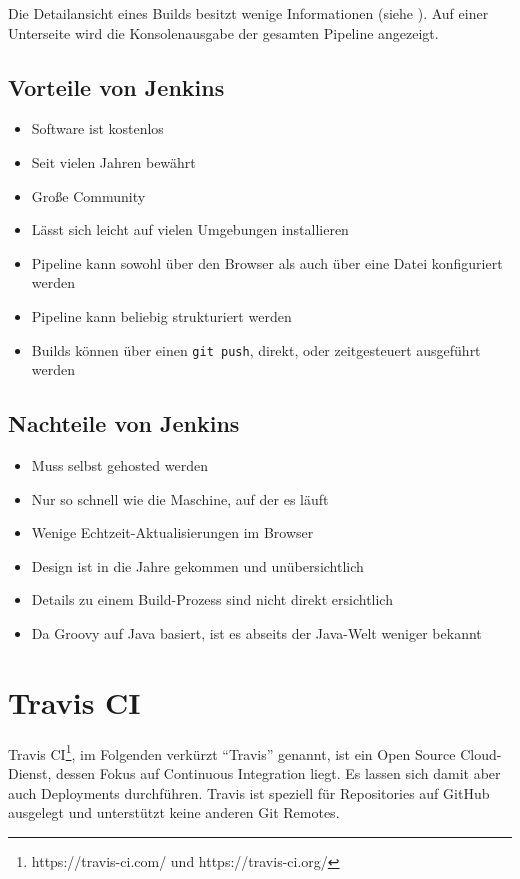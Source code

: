 Die Detailansicht eines Builds besitzt wenige Informationen (siehe ). Auf einer Unterseite wird die Konsolenausgabe der gesamten Pipeline angezeigt.

\subsection*{Vorteile von Jenkins}

\begin{itemize}
  \item Software ist kostenlos
  \item Seit vielen Jahren bewährt
  \item Große Community
  \item Lässt sich leicht auf vielen Umgebungen installieren
  \item Pipeline kann sowohl über den Browser als auch über eine Datei konfiguriert werden
  \item Pipeline kann beliebig strukturiert werden
  \item Builds können über einen \texttt{git push}, direkt, oder zeitgesteuert ausgeführt werden
\end{itemize}

\subsection*{Nachteile von Jenkins}

\begin{itemize}
  \item Muss selbst gehosted werden
  \item Nur so schnell wie die Maschine, auf der es läuft
  \item Wenige Echtzeit-Aktualisierungen im Browser
  \item Design ist in die Jahre gekommen und unübersichtlich
  \item Details zu einem Build-Prozess sind nicht direkt ersichtlich
  \item Da Groovy auf Java basiert, ist es abseits der Java-Welt weniger bekannt
\end{itemize}

\section{Travis CI}
\label{sec:analyse-travis}

Travis CI\footnote{https://travis-ci.com/ und https://travis-ci.org/}, im Folgenden verkürzt ``Travis'' genannt, ist ein Open Source Cloud-Dienst, dessen Fokus auf Continuous Integration liegt. Es lassen sich damit aber auch Deployments durchführen. Travis ist speziell für Repositories auf GitHub ausgelegt und unterstützt keine anderen Git Remotes.

